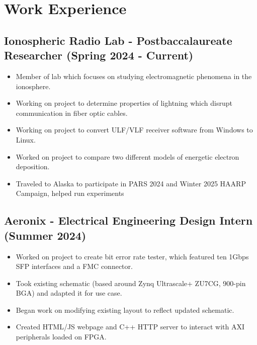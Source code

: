 \documentclass{article}
\newcommand{\sectionspacing}{\vspace{-0em}} %
\newenvironment{CustomItemize}
{ \begin{itemize}[leftmargin=1em]
    \setlength{\itemsep}{0pt}
    \setlength{\parskip}{0pt}
    \setlength{\parindent}{0pt}
    \setlength{\parsep}{0pt}     }
{ \end{itemize}                  }
\begin{document}

\sectionspacing{}

\section{Work Experience}
\subsection{Ionospheric Radio Lab - Postbaccalaureate Researcher (Spring 2024 - Current)}
\begin{CustomItemize}
\item Member of lab which focuses on studying electromagnetic phenomena in the ionosphere.
\item Working on project to determine properties of lightning which disrupt communication in fiber optic cables.
\item Working on project to convert ULF/VLF receiver software from Windows to Linux.
\item Worked on project to compare two different models of energetic electron deposition.
\item Traveled to Alaska to participate in PARS 2024 and Winter 2025 HAARP Campaign, helped run experiments
\end{CustomItemize}

\subsection{Aeronix - Electrical Engineering Design Intern (Summer 2024)}
\begin{CustomItemize}
\item Worked on project to create bit error rate tester, which featured ten 1Gbps SFP interfaces and a FMC connector.
\item Took existing schematic (based around Zynq Ultrascale+ ZU7CG, 900-pin BGA) and adapted it for use case.
\item Began work on modifying existing layout to reflect updated schematic.
\item Created HTML/JS webpage and C++ HTTP server to interact with AXI peripherals loaded on FPGA.
\end{CustomItemize}
\end{document}
